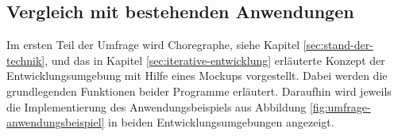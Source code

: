 %
%

\subsection{Vergleich mit bestehenden Anwendungen}
Im ersten Teil der Umfrage wird Choregraphe, siehe Kapitel \ref{sec:stand-der-technik}, und das in Kapitel \ref{sec:iterative-entwicklung} erläuterte Konzept der Entwicklungsumgebung mit Hilfe eines Mockups vorgestellt. Dabei werden die grundlegenden Funktionen beider Programme erläutert. Daraufhin wird jeweils die Implementierung des Anwendungsbeispiels aus Abbildung \ref{fig:umfrage-anwendungsbeispiel} in beiden Entwicklungsumgebungen angezeigt.


